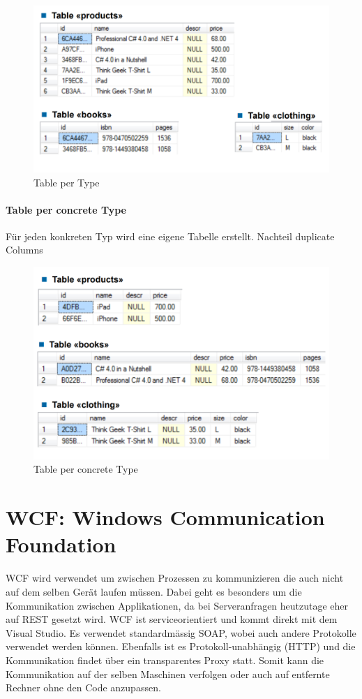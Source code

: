 \documentclass[
a4paper,
oneside,
10pt,
fleqn,
headsepline,
toc=listofnumbered, 
bibliography=totocnumbered]{scrartcl}
\let\stdsection\section
\renewcommand\section{\clearpage\stdsection}
\begin{document}
\begin{figure}[h!]
\centering
\includegraphics[width=0.8\linewidth]{images/tablePerType}
\caption{Table per Type}
\end{figure}

\paragraph{Table per concrete Type}
Für jeden konkreten Typ wird eine eigene Tabelle erstellt. Nachteil duplicate Columns

\begin{figure}[h!]
\centering
\includegraphics[width=0.8\linewidth]{images/tablePerConcreteType}
\caption{Table per concrete Type}
\end{figure}

\section{WCF: Windows Communication Foundation}
WCF wird verwendet um zwischen Prozessen zu kommunizieren die auch nicht auf dem selben Gerät laufen müssen. Dabei geht es besonders um die Kommunikation zwischen Applikationen, da bei Serveranfragen heutzutage eher auf REST gesetzt wird. WCF ist serviceorientiert und kommt direkt mit dem Visual Studio. Es verwendet standardmässig SOAP, wobei auch andere Protokolle verwendet werden können. Ebenfalls ist es Protokoll-unabhängig (HTTP) und die Kommunikation findet über ein transparentes Proxy statt. Somit kann die Kommunikation auf der selben Maschinen verfolgen oder auch auf entfernte Rechner ohne den Code anzupassen.
\end{document}
